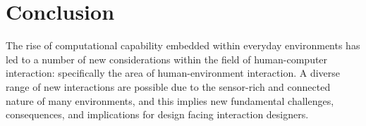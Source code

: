 \documentclass[oribibl,11pt]{llncs}
\begin{document}





\section{Conclusion}
The rise of computational capability embedded within everyday environments has led to a number of new considerations within the field of human-computer interaction: specifically the area of human-environment interaction. A diverse range of new interactions are possible due to the sensor-rich and connected nature of many environments, and this implies new fundamental challenges, consequences, and implications for design facing interaction designers.



\end{document}
